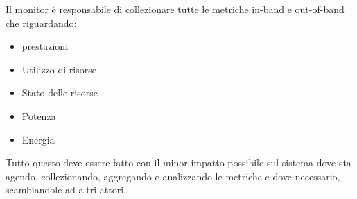 Il monitor è responsabile di collezionare tutte le metriche in-band e out-of-band che riguardando:
\begin{itemize}
    \item prestazioni
    \item Utilizzo di risorse
    \item Stato delle risorse
    \item Potenza
    \item Energia
\end{itemize}
Tutto questo deve essere fatto con il minor impatto possibile sul sistema dove sta agendo, collezionando, aggregando e analizzando le metriche e dove necessario, scambiandole ad altri attori.


